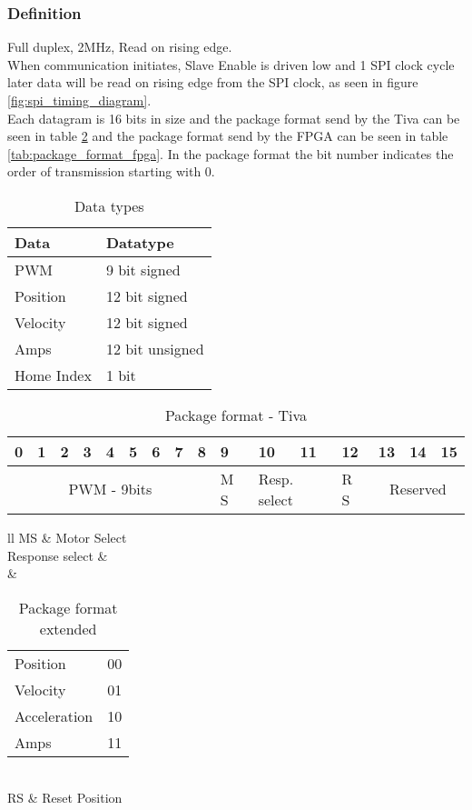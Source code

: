 \documentclass[../../../main]{subfiles}
\begin{document}
\subsubsection{Definition}
\label{sub:definition}
Full duplex, 2MHz, Read on rising edge.
\\
When communication initiates, Slave Enable is driven low and 1 SPI clock cycle later
data will be read on rising edge from the SPI clock, as seen in figure \ref{fig:spi_timing_diagram}.
\\
Each datagram is 16 bits in size and the package format send by the Tiva
can be seen in table \ref{tab:package_format_tiva} and the package format send by the FPGA
can be seen in table \ref{tab:package_format_fpga}.
In the package format the bit number indicates the order of transmission starting with 0.

\begin{table}[h]
	\centering
	\begin{tabular}{ll}
		\textbf{Data}& \textbf{Datatype}  \\
		\hline
		PWM& 9 bit signed \\
		Position& 12 bit signed \\
		Velocity& 12 bit signed \\
		Amps& 12 bit unsigned \\
		Home Index& 1 bit
	\end{tabular}
	\caption{Data types}
	\label{tab:spi_datatypes}
\end{table}

\begin{table}[h]
	\centering
	\begin{tabular}{|*{16}{p{.3cm}|}}
		\hline
		0&1&2&3&4&5&6&7&8&9&10&11&12&13&14&15\\
		\hline
		\multicolumn{9}{|c|}{PWM  - 9bits} & M S&
		\multicolumn{2}{p{.6cm}|}{Resp. select}& R S&
		\multicolumn{3}{c|}{Reserved}
		\\
		\hline
	\end{tabular}
	\caption{Package format - Tiva}
	\label{tab:package_format_tiva}
\end{table}
\begin{table}[h]
	\centering
	\begin{tabular}{ll}
		MS & Motor Select\\
		\hline
		Response select &\\ &
		\begin{tabular}{ll}
			Position & 00\\
			Velocity & 01\\
			Acceleration & 10\\
			Amps & 11
		\end{tabular}
		\\\hline
		RS & Reset Position
		\\\hline
	\end{tabular}
	\caption{Package format extended}
	\label{tab:shorthand}
\end{table}
\end{document}

